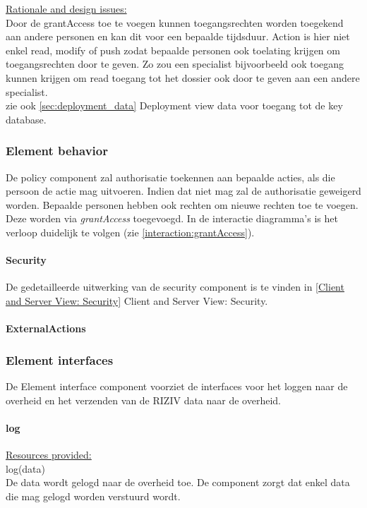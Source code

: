 \documentclass[a4paper,10pt]{article}
\begin{document}
\underline{Rationale and design issues:}\\
Door de grantAccess toe te voegen kunnen toegangsrechten worden toegekend aan andere personen en kan dit voor een bepaalde tijdsduur.  Action is hier niet enkel read, modify of push zodat bepaalde personen ook toelating krijgen om toegangsrechten door te geven.  Zo zou een specialist bijvoorbeeld ook toegang kunnen krijgen om read toegang tot het dossier ook door te geven aan een andere specialist.\\
zie ook \ref{sec:deployment_data} Deployment view data voor toegang tot de key database.

\subsubsection{Element behavior}
De policy component zal authorisatie toekennen aan bepaalde acties, als die persoon de actie mag uitvoeren.  Indien dat niet mag zal de authorisatie geweigerd worden.  Bepaalde personen hebben ook rechten om nieuwe rechten toe te voegen.  Deze worden via \textit{grantAccess} toegevoegd.  In de interactie diagramma's is het verloop duidelijk te volgen (zie \ref{interaction:grantAccess}).

\paragraph{Security}
De gedetailleerde uitwerking van de security component is te vinden in \ref{Client and Server View: Security} Client and Server View: Security.

\paragraph{ExternalActions}

\subsubsection{Element interfaces} 
De Element interface component voorziet de interfaces voor het loggen naar de overheid en het verzenden van de RIZIV data naar de overheid.

\paragraph{log}
\underline{Resources provided:}\\
log(data)\\
De data wordt gelogd naar de overheid toe.  De component zorgt dat enkel data die mag gelogd worden verstuurd wordt.
\end{document}
